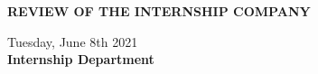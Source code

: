 \documentclass[a4paper,13pt]{report}
\begin{document}
    \newpage
    \centerline{\huge{\textbf{REVIEW OF THE INTERNSHIP COMPANY}}}
    \vspace{10mm}
    \noindent\makebox[\linewidth]{\rule{\paperwidth}{0.4pt}}
    \noindent\makebox[\linewidth]{\rule{\paperwidth}{0.4pt}}
    \noindent\makebox[\linewidth]{\rule{\paperwidth}{0.4pt}}
    \noindent\makebox[\linewidth]{\rule{\paperwidth}{0.4pt}}
    \noindent\makebox[\linewidth]{\rule{\paperwidth}{0.4pt}}
    \noindent\makebox[\linewidth]{\rule{\paperwidth}{0.4pt}}
    \noindent\makebox[\linewidth]{\rule{\paperwidth}{0.4pt}}
    \noindent\makebox[\linewidth]{\rule{\paperwidth}{0.4pt}}
    \noindent\makebox[\linewidth]{\rule{\paperwidth}{0.4pt}}
    \noindent\makebox[\linewidth]{\rule{\paperwidth}{0.4pt}}
    \noindent\makebox[\linewidth]{\rule{\paperwidth}{0.4pt}}
    \noindent\makebox[\linewidth]{\rule{\paperwidth}{0.4pt}}
    \noindent\makebox[\linewidth]{\rule{\paperwidth}{0.4pt}}
    \noindent\makebox[\linewidth]{\rule{\paperwidth}{0.4pt}}
    \noindent\makebox[\linewidth]{\rule{\paperwidth}{0.4pt}}
    \vspace{10mm}
    \begin{flushright}
        Tuesday, June 8th 2021 \\ 
        \vspace{5mm}
        \textbf{Internship Department}
    \end{flushright}

    \newpage
    \tableofcontents
    \listoffigures
\end{document}
